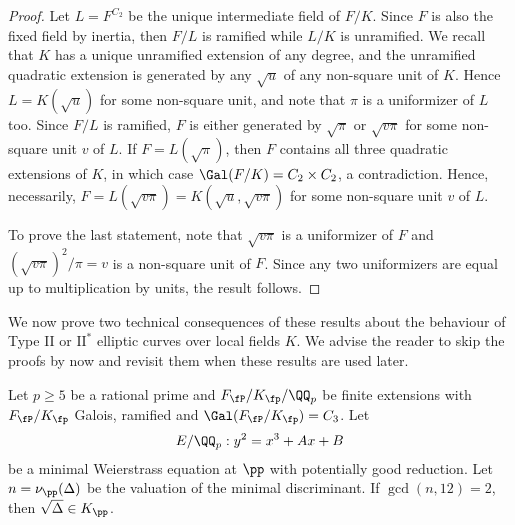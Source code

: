 \begin{proof}
    Let $L=F^{C_2}$ be the unique intermediate field of $F/K$. Since $F$ is also the fixed field by inertia, then $F/L$ is ramified while $L/K$ is unramified. We recall that $K$ has a unique unramified extension of any degree, and the unramified quadratic extension is generated by any $\sqrt{u}$ of any non-square unit of $K$. Hence $L=K(\sqrt{u})$ for some non-square unit, and note that $\pi$ is a uniformizer of $L$ too. Since $F/L$ is ramified, $F$ is either generated by $\sqrt{\pi}$ or $\sqrt{v\pi}$ for some non-square unit $v$ of $L$. If $F=L(\sqrt{\pi})$, then $F$ contains all three quadratic extensions of $K$, in which case $\Gal(F/K)=C_2\times C_2$, a contradiction. Hence, necessarily, $F=L(\sqrt{v\pi})=K(\sqrt{u},\sqrt{v\pi})$ for some non-square unit $v$ of $L$.

    To prove the last statement, note that $\sqrt{v\pi}$ is a uniformizer of $F$ and $(\sqrt{v\pi})^2/\pi=v$ is a non-square unit of $F$. Since any two uniformizers are equal up to multiplication by units, the result follows. 
\end{proof}

We now prove two technical consequences of these results about the behaviour of Type II or $\mathrm{II}^*$ elliptic curves over local fields $K$. We advise the reader to skip the proofs by now and revisit them when these results are used later.

\begin{lemma}\label{lem_nottwo}
    Let $p\geq 5$ be a rational prime and $F_\fP/K_\fp/\QQ_p$ be finite extensions with $F_\fP/K_\fp$ Galois, ramified and $\Gal(F_\fP/K_\fp)=C_3$. Let $$E/\QQ_p:y^2=x^3+Ax+B$$ be a minimal Weierstrass equation at $\pp$ with potentially good reduction. Let $n=\nu_\pp(\Delta)$ be the valuation of the minimal discriminant. If $\gcd(n,12)=2$, then $\sqrt{\Delta}\in K_\pp$.
\end{lemma}

